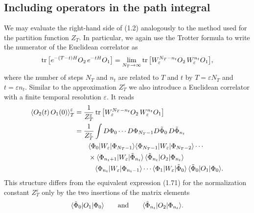 \subsection{Including operators in the path integral}

We may evaluate the right-hand side of (1.2) analogously to the method used for
the partition function $Z_T$. In particular, we again use the Trotter formula
to write the numerator of the Euclidean correlator as
\begin{equation}
  \operatorname{tr}\big[e^{-(T-t)H}O_2\,e^{-tH}O_1\big]
  = \lim_{N_T\to\infty}\operatorname{tr}\big[W_\varepsilon^{N_T-n_t}O_2\,W_\varepsilon^{n_t}O_1\big],
\end{equation}
where the number of steps $N_T$ and $n_t$ are related to $T$ and $t$ by
$T = \varepsilon N_T$ and $t = \varepsilon n_t$. Similar to the approximation
$Z_T^\varepsilon$ we also introduce a Euclidean correlator with a finite
temporal resolution $\varepsilon$. It reads
\begin{align}
  \left\langle O_2(t)\,O_1(0) \right\rangle_T^\varepsilon
  &= \frac{1}{Z_T^\varepsilon}\operatorname{tr}\big[W_\varepsilon^{N_T-n_t}O_2\,W_\varepsilon^{n_t}O_1\big] \notag\\
  &= \frac{1}{Z_T^\varepsilon}\int D\Phi_0\cdots D\Phi_{N_T-1}
     D\tilde{\Phi}_0\,D\tilde{\Phi}_{n_t}\, \notag\\
  &\qquad \langle\Phi_0|W_\varepsilon|\Phi_{N_T-1}\rangle
     \langle\Phi_{N_T-1}|W_\varepsilon|\Phi_{N_T-2}\rangle\cdots \notag\\
  &\qquad \times \langle\Phi_{n_t+1}|W_\varepsilon|\tilde{\Phi}_{n_t}\rangle\,
     \langle\tilde{\Phi}_{n_t}|O_2|\Phi_{n_t}\rangle \notag\\
  &\qquad\quad \langle\Phi_{n_t}|W_\varepsilon|\Phi_{n_t-1}\rangle\cdots
     \langle\Phi_1|W_\varepsilon|\tilde{\Phi}_0\rangle\,
     \langle\tilde{\Phi}_0|O_1|\Phi_0\rangle.
\end{align}
This structure differs from the equivalent expression (1.71) for the
normalization constant $Z_T^\varepsilon$ only by the two insertions of the
matrix elements
\begin{equation}
  \langle\tilde{\Phi}_0|O_1|\Phi_0\rangle
  \qquad \text{and} \qquad
  \langle\tilde{\Phi}_{n_t}|O_2|\Phi_{n_t}\rangle.
\end{equation}


